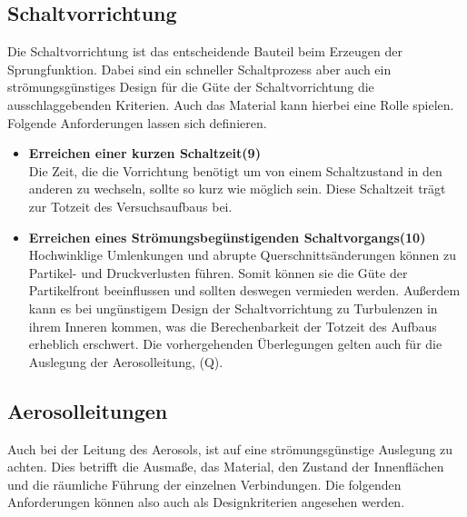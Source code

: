 \subsection{Schaltvorrichtung}
Die Schaltvorrichtung ist das entscheidende Bauteil beim Erzeugen der Sprungfunktion. Dabei sind ein schneller Schaltprozess aber auch ein str\"{o}mungsg\"{u}nstiges Design f\"{u}r die G\"{u}te der Schaltvorrichtung die ausschlaggebenden Kriterien. Auch das Material kann hierbei eine Rolle spielen. Folgende Anforderungen lassen sich definieren.

\begin{itemize}
\item \textbf{Erreichen einer kurzen Schaltzeit(9)}\\
Die Zeit, die die Vorrichtung ben\"{o}tigt um von einem Schaltzustand in den anderen zu wechseln, sollte so kurz wie m\"{o}glich sein. Diese Schaltzeit tr\"{a}gt zur Totzeit des Versuchsaufbaus bei. 
	
\item \textbf{Erreichen eines Str\"{o}mungsbeg\"{u}nstigenden Schaltvorgangs(10)}\\ 
Hochwinklige Umlenkungen und abrupte Querschnitts\"{a}nderungen k\"{o}nnen zu Partikel- und Druckverlusten f\"{u}hren. Somit k\"{o}nnen sie die G\"{u}te der Partikelfront beeinflussen und sollten deswegen vermieden werden. Außerdem kann es bei ung\"{u}nstigem Design der Schaltvorrichtung zu Turbulenzen in ihrem Inneren kommen, was die Berechenbarkeit der Totzeit des Aufbaus erheblich erschwert. Die vorhergehenden \"{U}berlegungen gelten auch f\"{u}r die Auslegung der Aerosolleitung, (Q).
\end{itemize}

\subsection{Aerosolleitungen}
Auch bei der Leitung des Aerosols, ist auf eine str\"{o}mungsg\"{u}nstige Auslegung zu achten. Dies betrifft die Ausma{\ss}e, das Material, den Zustand der Innenfl\"{a}chen und die r\"{a}umliche F\"{u}hrung der einzelnen Verbindungen. Die folgenden Anforderungen k\"{o}nnen also auch als Designkriterien angesehen werden.

